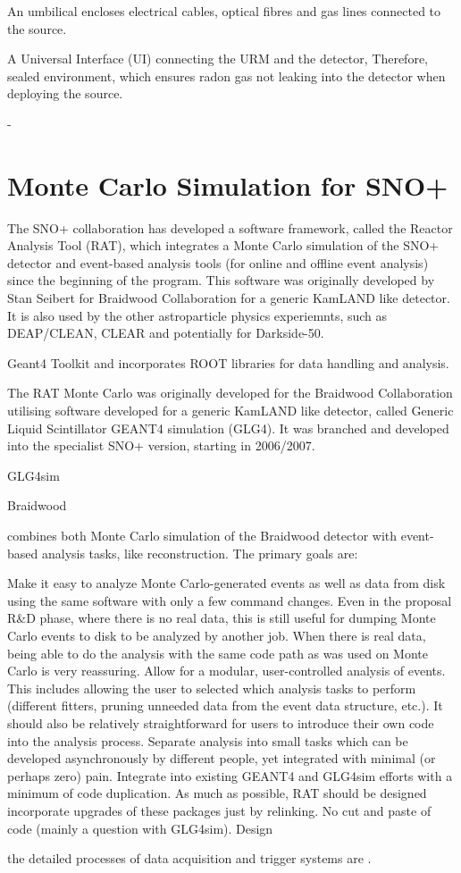 An umbilical encloses electrical cables, optical fibres and gas lines connected to the source.

A Universal Interface (UI) connecting the URM and the detector, 
Therefore, sealed environment, which 
ensures radon gas not leaking into the detector when deploying the source.

-

\section{Monte Carlo Simulation for SNO+}
The SNO+ collaboration has developed a software framework, called the Reactor Analysis
Tool (RAT), which integrates a Monte Carlo simulation of the SNO+ detector and event-based analysis tools (for online and offline event analysis) since the beginning of the program. This software was originally developed by Stan Seibert for Braidwood Collaboration for a generic KamLAND like detector. It is also used by the other astroparticle physics experiemnts, such as DEAP/CLEAN, CLEAR and potentially for Darkside-50.







Geant4 Toolkit and
incorporates ROOT libraries for data handling and analysis.



The RAT Monte Carlo was originally developed for the Braidwood Collaboration
utilising software developed for a generic KamLAND like detector, called Generic Liquid Scintillator GEANT4 simulation (GLG4). It was branched and
developed into the specialist SNO+ version, starting in 2006/2007.

GLG4sim


Braidwood






 combines both Monte Carlo simulation of the Braidwood detector with event-based analysis tasks, like reconstruction. The primary goals are:

Make it easy to analyze Monte Carlo-generated events as well as data from disk using the same software with only a few command changes. Even in the proposal R\&D phase, where there is no real data, this is still useful for dumping Monte Carlo events to disk to be analyzed by another job. When there is real data, being able to do the analysis with the same code path as was used on Monte Carlo is very reassuring.
Allow for a modular, user-controlled analysis of events. This includes allowing the user to selected which analysis tasks to perform (different fitters, pruning unneeded data from the event data structure, etc.). It should also be relatively straightforward for users to introduce their own code into the analysis process.
Separate analysis into small tasks which can be developed asynchronously by different people, yet integrated with minimal (or perhaps zero) pain.
Integrate into existing GEANT4 and GLG4sim efforts with a minimum of code duplication. As much as possible, RAT should be designed incorporate upgrades of these packages just by relinking. No cut and paste of code (mainly a question with GLG4sim).
Design


the detailed processes of data acquisition and trigger systems are \cite{whitepaper}.


\cite{ratManual}





